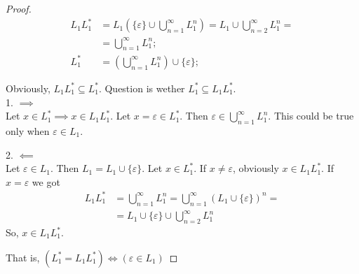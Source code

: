 \begin{proof}


	

	\begin{align*}
		L_1 L_1^* & = L_1 \left(\{\varepsilon\} \cup \bigcup_{n=1}^\infty L_1^n\right) = 
		L_1 \cup  \bigcup_{n=2}^\infty L_1^n = \\ & = \bigcup_{n=1}^\infty L_1^n; \\
		L_1^* & = \left(\bigcup_{n=1}^\infty L_1^n\right) \cup \{\varepsilon\};
	\end{align*}

	Obviously, $L_1 L_1^* \subseteq L_1^*$. Question is wether $L_1^* \subseteq L_1 L_1^*$. \\

	1. $\implies$ \\
	Let $x \in L_1^* \implies x \in L_1 L_1^*$. 
	Let $x = \varepsilon \in L_1^*$. Then $\varepsilon \in \bigcup_{n=1}^\infty L_1^n$.
	This could be true only when $\varepsilon \in L_1$. \qedsymbol 

	2. $\impliedby$ \\
	Let $\varepsilon \in L_1$.
	Then $L_1 = L_1 \cup \{\varepsilon\}$. 
	Let $x \in L_1^*$. If $x \ne \varepsilon$, obviously $x \in L_1 L_1^*$.
	If $x = \varepsilon$ we got
	\begin{align*}
		L_1 L_1^* & = \bigcup_{n=1}^\infty L_1^n = \bigcup_{n=1}^\infty (L_1 \cup \{\varepsilon\})^n = \\
		& = L_1 \cup \{\varepsilon\} \cup \bigcup_{n=2}^\infty L_1^n
	\end{align*}
	So, $x \in L_1 L_1^*$. \qedsymbol

	That is, $(L_1^* = L_1 L_1^*) \iff (\varepsilon \in L_1)$
\end{proof}
